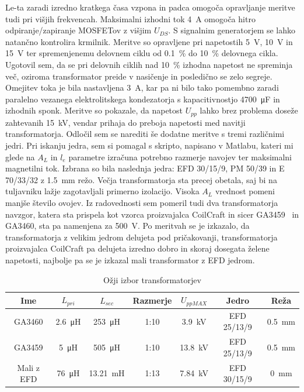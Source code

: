 \documentclass[a4paper,twoside,openright,12pt,Slovene]{book}
\begin{document}
Le-ta zaradi izredno kratkega časa vzpona in padca omogoča opravljanje meritve tudi pri višjih frekvencah. Maksimalni izhodni tok \SI{4}{\ampere} omogoča hitro odpiranje/zapiranje MOSFETov z višjim \(U_{DS}\). S signalnim generatorjem se lahko natančno kontrolira krmilnik. Meritve so opravljene pri napetostih \SI{5}{\volt}, \SI{10}{\volt} in \SI{15}{\volt} ter spremenjenemu delovnem ciklu od \SI{0,1}{\percent} do \SI{10}{\percent} delovnega cikla. Ugotovil sem, da se pri delovnih ciklih nad \SI{10}{\percent} izhodna napetost ne spreminja več, oziroma transformator preide v nasičenje in posledično se zelo segreje. Omejitev toka je bila nastavljena \SI{3}{\ampere}, kar pa ni bilo tako pomembno zaradi paralelno vezanega elektrolitskega kondezatorja s kapacitivnostjo \SI{4700}{\micro\farad} in izhodnih sponk. Meritve so pokazale, da napetost \(U_{pp}\) lahko brez problema doseže zahtevanih \SI{15}{\kilo\volt}, vendar prihaja do preboja napetosti med navitji transformatorja. Odločil sem se narediti še dodatne meritve s tremi različnimi jedri. Pri iskanju jedra, sem si pomagal s skripto, napisano v Matlabu, kateri mi glede na \(A_L\) in \(l_e\) parametre izračuna potrebno razmerje navojev ter maksimalni magnetilni tok. Izbrana so bila naslednja jedra: EFD 30/15/9, PM 50/39 in E 70/33/32 z \SI{1,5}{\milli\meter} režo. Večja transformatorja sta precej obetala, saj bi na tuljavniku lažje zagotavljali primerno izolacijo. Visoka \(A_L\) vrednost pomeni manjše število ovojev. Iz radovednosti sem pomeril tudi dva transformatorja navzgor, katera sta prispela kot vzorca proizvajalca CoilCraft in sicer GA3459~\cite{Coilcraft:GA3459} in GA3460, sta pa namenjena za \SI{500}{\volt}. Po meritvah se je izkazalo, da transformatorja z velikim jedrom delujeta pod pričakovanji, transformatorja proizvajalca CoilCraft pa delujeta izredno dobro in skoraj dosegata želene napetosti, najbolje pa se je izkazal mali transformator z EFD jedrom. 
 
\begin{table}[h!]
\centering
\begin{tabular}{||c|c|c|c|c|c|c||}
\hline
Ime & \(L_{pri}\) & \(L_{sec}\) & Razmerje & \(U_{pp MAX}\) & Jedro & Reža \\ [0.5ex]
\hline\hline
GA3460 & \SI{2.6}{\micro\henry} & \SI{253}{\micro\henry} & 1:10 & \SI{3.9}{\kilo\volt} & EFD 25/13/9 & \SI{0.5}{\milli\meter} \\
\hline
GA3459 & \SI{5}{\micro\henry} & \SI{505}{\micro\henry} & 1:10 & \SI{13.8}{\kilo\volt} & EFD 25/13/9 & \SI{0.5}{\milli\meter} \\
\hline
Mali z EFD & \SI{76}{\micro\henry} & \SI{13.21}{\milli\henry} & 1:13 & \SI{7.84}{\kilo\volt} & EFD 30/15/9 & \SI{0}{\milli\meter} \\
\hline
\end{tabular}

\caption{Ožji izbor transformatorjev}

\end{table}
\end{document}
